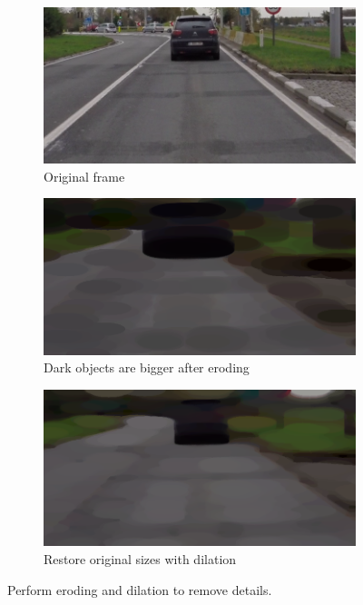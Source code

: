 \documentclass[runningheads,a4paper]{llncs}
\begin{document}
\begin{figure}[ht]
\centering
\begin{subfigure}{.5\textwidth}
  \centering
  \includegraphics[width=.9\textwidth]{fig/car_original.png}
  \caption{Original frame\label{car_original}}
\end{subfigure}%
\begin{subfigure}{.5\textwidth}
  \centering
  \includegraphics[width=.9\textwidth]{fig/car_erode_bigger.png}
  \caption{Dark objects are bigger after eroding\label{car_erode_bigger}}
\end{subfigure}
\begin{subfigure}{.5\textwidth}
  \centering
  \includegraphics[width=.9\textwidth]{fig/car_dilate_smaller.png}
  \caption{Restore original sizes with dilation\label{car_dilate_smaller}}
\end{subfigure}
\caption{Perform eroding and dilation to remove details.}
\end{figure}
\end{document}
